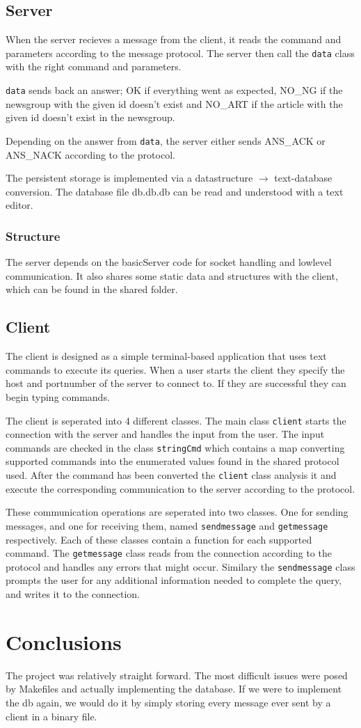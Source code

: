 \documentclass[12pt]{article}
\begin{document}
\subsection*{Server}
When the server recieves a message from the client, it reads the command and parameters according to the message protocol. The server then call the \verb!data! class with the right command and parameters.

\verb!data! sends back an answer; OK if everything went as expected, NO\_NG if the newsgroup with the given id doesn't exist and NO\_ART if the article with the given id doesn't exist in the newsgroup.

Depending on the answer from \verb!data!, the server either sends ANS\_ACK or ANS\_NACK according to the protocol.

The persistent storage is implemented via a datastructure $\rightarrow$ text-database conversion. The database file db.db.db can be read and understood with a text editor.

\subsubsection*{Structure}
The server depends on the basicServer code for socket handling and lowlevel communication.
It also shares some static data and structures with the client, which can be found in the shared folder.


\subsection*{Client}
The client is designed as a simple terminal-based application that uses text commands to execute its queries. When a user starts the client they specify the host and portnumber of the server to connect to. If they are successful they can begin typing commands.

The client is seperated into 4 different classes. The main class \verb!client! starts the connection with the server and handles the input from the user. The input commands are checked in the class \verb!stringCmd! which contains a map converting supported commands into the enumerated values found in the shared protocol used. After the command has been converted the \verb!client! class analysis it and execute the corresponding communication to the server according to the protocol.

These communication operations are seperated into two classes. One for sending messages, and one for receiving them, named \verb!sendmessage! and \verb!getmessage! respectively. Each of these classes contain a function for each supported command. The \verb!getmessage! class reads from the connection according to the protocol and handles any errors that might occur. Similary the \verb!sendmessage! class prompts the user for any additional information needed to complete the query, and writes it to the connection.


\section{Conclusions}
The project was relatively straight forward. The most difficult issues were posed by Makefiles and actually implementing the database. If we were to implement the db again, we would do it by simply storing every message ever sent by a client in a binary file.
\end{document}
